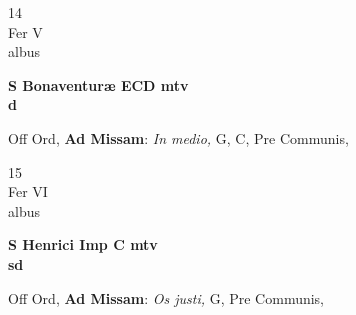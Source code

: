 \documentclass[10pt, openany]{book}
\begin{document}
        \begin{center}
            \begin{minipage}{3.5in}
                \vspace{2em}
                \begin{minipage}{0.5in}
                    {\Huge 14} \\
                    {\normalsize Fer V} \\
                    {\normalsize albus}
                \end{minipage}
                \begin{minipage}{3.0in}
                    \textbf{ \large S Bonaventuræ ECD mtv \\
                    \textnormal{\normalsize d}} \\ 
                \end{minipage}
                \begin{justify}Off Ord, \textbf{Ad Missam}: \textit{In medio,} G, C, Pre Communis,  
                \end{justify}
            \end{minipage}
        \end{center}
    
        \begin{center}
            \begin{minipage}{3.5in}
                \vspace{2em}
                \begin{minipage}{0.5in}
                    {\Huge 15} \\
                    {\normalsize Fer VI} \\
                    {\normalsize albus}
                \end{minipage}
                \begin{minipage}{3.0in}
                    \textbf{ \large S Henrici Imp C mtv \\
                    \textnormal{\normalsize sd}} \\ 
                \end{minipage}
                \begin{justify}Off Ord, \textbf{Ad Missam}: \textit{Os justi,} G, Pre Communis,  
                \end{justify}
            \end{minipage}
        \end{center}
    
\end{document}
